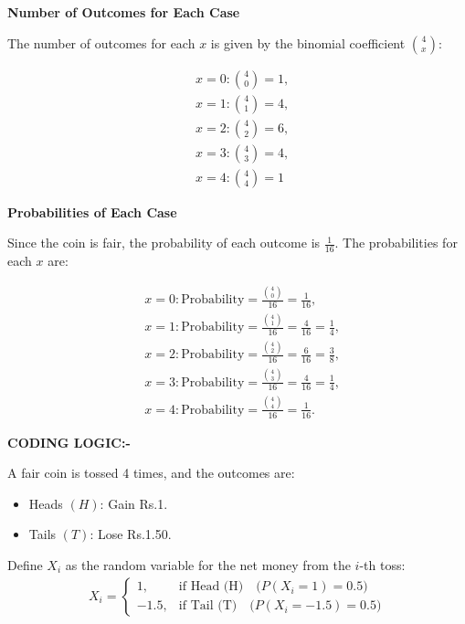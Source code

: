 \documentclass[journal]{IEEEtran}
\numberwithin{equation}{enumi}
\numberwithin{figure}{enumi}
\begin{document}
\textbf{Number of Outcomes for Each Case}

The number of outcomes for each $ x $ is given by the binomial coefficient $ \binom{4}{x} $:

\begin{align}
    &x = 0: \binom{4}{0} = 1, \\
    &x = 1: \binom{4}{1} = 4, \\
    &x = 2: \binom{4}{2} = 6, \\
    &x = 3: \binom{4}{3} = 4, \\
    &x = 4: \binom{4}{4} = 1
\end{align}

\textbf{Probabilities of Each Case}

Since the coin is fair, the probability of each outcome is $ \frac{1}{16} $. The probabilities for each $ x $ are:

\begin{align}
    &x = 0: \text{Probability} = \frac{\binom{4}{0}}{16} = \frac{1}{16}, \\
    &x = 1: \text{Probability} = \frac{\binom{4}{1}}{16} = \frac{4}{16} = \frac{1}{4}, \\
    &x = 2: \text{Probability} = \frac{\binom{4}{2}}{16} = \frac{6}{16} = \frac{3}{8}, \\
    &x = 3: \text{Probability} = \frac{\binom{4}{3}}{16} = \frac{4}{16} = \frac{1}{4}, \\
    &x = 4: \text{Probability} = \frac{\binom{4}{4}}{16} = \frac{1}{16}.
\end{align}


\textbf{CODING LOGIC:-}



A fair coin is tossed 4 times, and the outcomes are:
\begin{itemize}
    \item Heads $(H)$: Gain Rs.1.
    \item Tails $(T)$: Lose Rs.1.50.
\end{itemize}

Define $X_i$ as the random variable for the net money from the $i$-th toss:
\begin{align}
X_i =
\begin{cases}
1, & \text{if Head (H)} \quad \big(P(X_i = 1) = 0.5\big) \\
-1.5, & \text{if Tail (T)} \quad \big(P(X_i = -1.5) = 0.5\big)
\end{cases}
\end{align}
\end{document}
